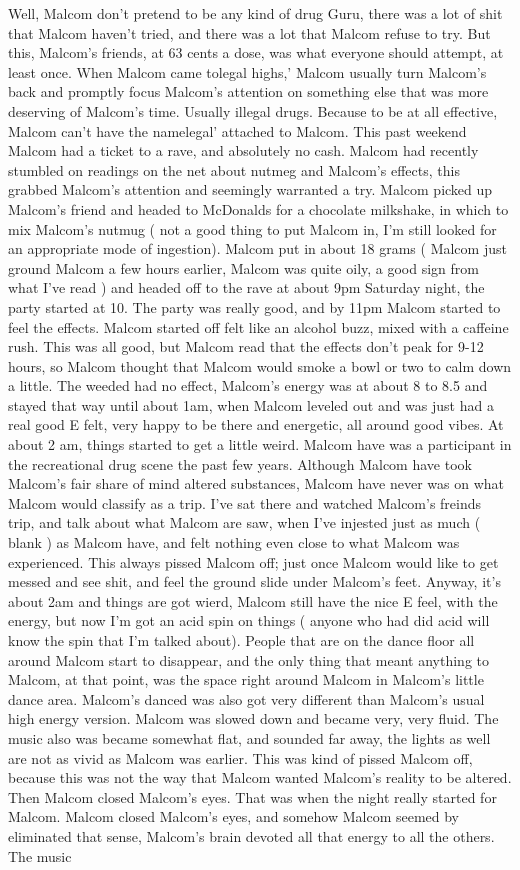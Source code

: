 \documentclass[12pt]{book}
\begin{document}
Well, Malcom don't pretend to be any kind of drug Guru, there was a lot of shit that Malcom haven't tried, and there was a lot that Malcom refuse to try. But this, Malcom's friends, at 63 cents a dose, was what everyone should attempt, at least once. When Malcom came tolegal highs,' Malcom usually turn Malcom's back and promptly focus Malcom's attention on something else that was more deserving of Malcom's time. Usually illegal drugs. Because to be at all effective, Malcom can't have the namelegal' attached to Malcom. This past weekend Malcom had a ticket to a rave, and absolutely no cash. Malcom had recently stumbled on readings on the net about nutmeg and Malcom's effects, this grabbed Malcom's attention and seemingly warranted a try. Malcom picked up Malcom's friend and headed to McDonalds for a chocolate milkshake, in which to mix Malcom's nutmug ( not a good thing to put Malcom in, I'm still looked for an appropriate mode of ingestion). Malcom put in about 18 grams ( Malcom just ground Malcom a few hours earlier, Malcom was quite oily, a good sign from what I've read ) and headed off to the rave at about 9pm Saturday night, the party started at 10. The party was really good, and by 11pm Malcom started to feel the effects. Malcom started off felt like an alcohol buzz, mixed with a caffeine rush. This was all good, but Malcom read that the effects don't peak for 9-12 hours, so Malcom thought that Malcom would smoke a bowl or two to calm down a little. The weeded had no effect, Malcom's energy was at about 8 to 8.5 and stayed that way until about 1am, when Malcom leveled out and was just had a real good E felt, very happy to be there and energetic, all around good vibes. At about 2 am, things started to get a little weird. Malcom have was a participant in the recreational drug scene the past few years. Although Malcom have took Malcom's fair share of mind altered substances, Malcom have never was on what Malcom would classify as a trip. I've sat there and watched Malcom's freinds trip, and talk about what Malcom are saw, when I've injested just as much ( blank ) as Malcom have, and felt nothing even close to what Malcom was experienced. This always pissed Malcom off; just once Malcom would like to get messed and see shit, and feel the ground slide under Malcom's feet. Anyway, it's about 2am and things are got wierd, Malcom still have the nice E feel, with the energy, but now I'm got an acid spin on things ( anyone who had did acid will know the spin that I'm talked about). People that are on the dance floor all around Malcom start to disappear, and the only thing that meant anything to Malcom, at that point, was the space right around Malcom in Malcom's little dance area. Malcom's danced was also got very different than Malcom's usual high energy version. Malcom was slowed down and became very, very fluid. The music also was became somewhat flat, and sounded far away, the lights as well are not as vivid as Malcom was earlier. This was kind of pissed Malcom off, because this was not the way that Malcom wanted Malcom's reality to be altered. Then Malcom closed Malcom's eyes. That was when the night really started for Malcom. Malcom closed Malcom's eyes, and somehow Malcom seemed by eliminated that sense, Malcom's brain devoted all that energy to all the others. The music 
\end{document}

